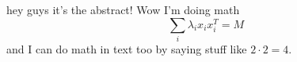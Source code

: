 hey guys it's the abstract! Wow I'm doing math
\[\sum_i \lambda_i x_ix_i^T = M\]
and I can do math in text too by saying stuff like $2 \cdot 2 = 4$.